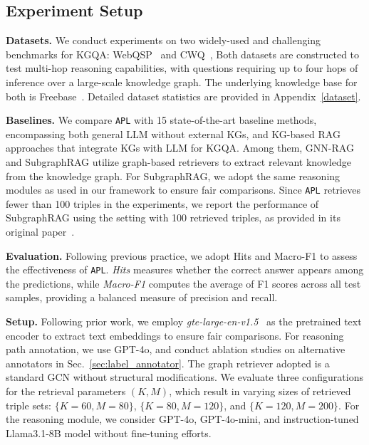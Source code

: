 \documentclass{article}
\theoremstyle{plain}
\theoremstyle{definition}
\theoremstyle{remark}
\newcommand{\ti}[1]{\textit{#1}}
\newcommand{\tb}[1]{\textbf{#1}}
\newcommand{\proj}{\texttt{\scalebox{1.03}{R}APL}}
\begin{document}
\subsection{Experiment Setup}
\noindent\tb{Datasets.} We conduct experiments on two widely-used and challenging benchmarks for KGQA: WebQSP~\citep{yih2016value} and CWQ~\citep{talmor2018web}, Both datasets are constructed to test multi-hop reasoning capabilities, with questions requiring up to four hops of inference over a large-scale knowledge graph. The underlying knowledge base for both is Freebase~\citep{bollacker2008freebase}. Detailed dataset statistics are provided in Appendix~\ref{dataset}. 

\noindent\tb{Baselines.} We compare \proj{} with 15 state-of-the-art baseline methods, encompassing both general LLM without external KGs, and KG-based RAG approaches that integrate KGs with LLM for KGQA. Among them, GNN-RAG and SubgraphRAG utilize graph-based retrievers to extract relevant knowledge from the knowledge graph. For SubgraphRAG, we adopt the same reasoning modules as used in our framework to ensure fair comparisons. Since \proj{} retrieves fewer than 100 triples in the experiments, we report the performance of SubgraphRAG using the setting with 100 retrieved triples, as provided in its original paper~\cite{li2024simple}.

\noindent\tb{Evaluation.} Following previous practice, we adopt Hits and Macro-F1 to assess the effectiveness of \proj. \textit{Hits} measures whether the correct answer appears among the predictions, while \textit{Macro-F1} computes the average of F1 scores across all test samples, providing a balanced measure of precision and recall.

\noindent\tb{Setup.} Following prior work, we employ \ti{gte-large-en-v1.5}~\cite{li2023towards} as the pretrained text encoder to extract text embeddings to ensure fair comparisons. For reasoning path annotation, we use GPT-4o, and conduct ablation studies on alternative annotators in Sec.~\ref{sec:label_annotator}. The graph retriever adopted is a standard GCN without structural modifications. We evaluate three configurations for the retrieval parameters $(K, M)$, which result in varying sizes of retrieved triple sets: $\{K=60, M=80\}$, $\{K=80, M=120\}$, and $\{K=120, M=200\}$. For the reasoning module, we consider GPT-4o, GPT-4o-mini, and instruction-tuned Llama3.1-8B model without fine-tuning efforts.
\end{document}
